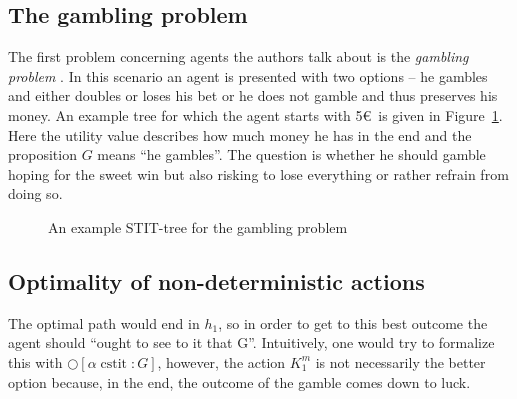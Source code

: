 \documentclass{article}
\newcommand{\cstit}{\operatorname{cstit}}
\begin{document}
\subsection{The gambling problem}
The first problem concerning agents the authors talk about is the \emph{gambling problem} \cite{mdl}. In this scenario an agent is presented with two options -- he gambles and either doubles or loses his bet or he does not gamble and thus preserves his money. An example tree for which the agent starts with 5\euro\ is given in Figure~\ref{fig:gambling-tree}. Here the utility value describes how much money he has in the end and the proposition $G$ means \enquote{he gambles}. The question is whether he should gamble hoping for the sweet win but also risking to lose everything or rather refrain from doing so.

\begin{figure}[ht]
    \centering
    \caption{An example STIT-tree for the gambling problem}
    \label{fig:gambling-tree}
\end{figure}

\subsection{Optimality of non-deterministic actions}
The optimal path would end in $h_1$, so in order to get to this best outcome the agent should \enquote{ought to see to it that G}. Intuitively, one would try to formalize this with $\bigcirc[\alpha \cstit \colon G]$, however, the action $K^m_1$ is not necessarily the better option because, in the end, the outcome of the gamble comes down to luck. 
\end{document}
